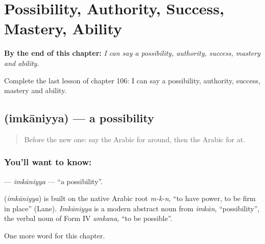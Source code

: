 
\chapter{Possibility, Authority, Success, Mastery, Ability}
\label{ch:ar-possibility-authority-success-mastery-ability}

\begin{chapteropening}
\textbf{By the end of this chapter:} \emph{I can say a possibility, authority, success, mastery and ability.}

Complete the last lesson of chapter 106: I can say a possibility, authority, success, mastery and ability.
\end{chapteropening}

\section[\texorpdfstring{\ar{إمكانية} (imkāniyya)}{إمكانية (imkāniyya)}]{ (imkāniyya) — a possibility}

\label{lesson:AR-C106-imkaniyya}



\begin{quote}
Before the new one: say the Arabic for around, then the Arabic for at.
\end{quote}

\subsection*{You'll want to know: }
\textbf{} — \emph{imkāniyya} — \textquotedblleft{}a possibility\textquotedblright{}.

\begin{cousinweb}
\textbf{} (\emph{imkāniyya}) is built on the native Arabic root \emph{m-k-n}, \textquotedblleft{}to have power, to be firm in place\textquotedblright{} (Lane). \emph{Imkāniyya} is a modern abstract noun from \emph{imkān}, \textquotedblleft{}possibility\textquotedblright{}, the verbal noun of Form IV \emph{amkana}, \textquotedblleft{}to be possible\textquotedblright{}.
\end{cousinweb}

\begin{grammarlens}[title={What you've built}]
One more word for this chapter.
\end{grammarlens}

